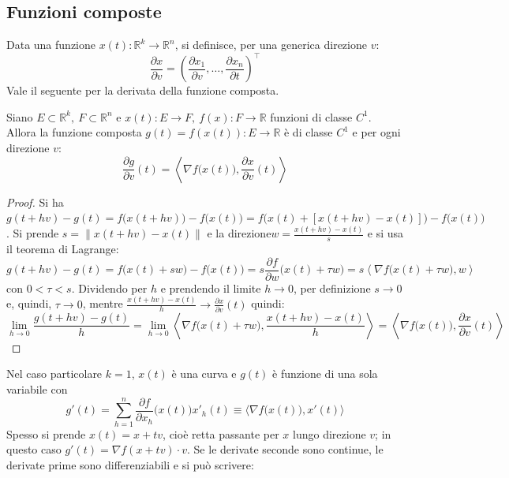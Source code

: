 \documentclass[10pt, a4paper]{scrartcl}
\theoremstyle{definition}
\numberwithin{esempio}{section}
\theoremstyle{definition}
\numberwithin{obs}{section}
\numberwithin{nota}{section}
\numberwithin{equation}{subsection}
\begin{document}
\subsection{Funzioni composte}
	Data una funzione $x(t) : \mathbb{R}^k \to \mathbb{R}^n$, si definisce, per una generica direzione $v$:
	\begin{equation}
		\frac{\partial x}{\partial v} = \left(\frac{\partial x_1}{\partial v}, \ldots , \frac{\partial x_n}{\partial t}  \right) ^\top
	\end{equation}
Vale il seguente per la derivata della funzione composta.
\begin{teorema}
	{}{}
	Siano $E \subset  \mathbb{R}^k , \ F \subset \mathbb{R}^n$ e $x(t) : E \to F , \ f(x) : F \to \mathbb{R}$ funzioni di classe $C^1$. Allora la funzione composta $g(t) = f(x(t)) : E \to\mathbb{R}$ \`e di classe $C^1$ e per ogni direzione $v$:
	\begin{equation}
		\frac{\partial g}{\partial v} (t) =\left\langle \nabla f\big(x(t)\big), \frac{\partial x}{\partial v} (t) \right\rangle
	\end{equation}
	\begin{proof}
		Si ha $g(t + h v) -g(t) = f\big(x(t+hv)\big) - f\big(x(t)\big) = f\big(x(t) + [x(t+hv) - x(t)]\big) - f\big(x(t)\big)$. Si prende $s = \lVert x(t+hv) - x(t) \rVert $ e la direzione$w = \frac{x(t+hv) - x(t)}{s}$ e si usa il teorema di Lagrange:
		\[
		g(t+hv) - g(t) = f\big(x(t) + s w\big) - f\big(x(t)\big) = s \frac{\partial f}{\partial w} \big(x(t) + \tau w\big) = s \left\langle \nabla f \big(x(t) + \tau  w\big), w \right\rangle
		\] 
	con $0<\tau <s$. Dividendo per $h$ e prendendo il limite $h\to 0$, per definizione $s \to 0$ e, quindi, $\tau  \to 0$, mentre $\frac{x(t+hv) - x(t)}{h}\to \frac{\partial x}{\partial v} (t)$ quindi:
\[
\lim_{h \to 0} \frac{g(t+ hv) -g(t)}{h} = \lim_{h \to 0} \left\langle \nabla f\big(x(t) + \tau  w\big), \frac{x(t+hv) - x(t)}{h} \right\rangle = \left\langle\nabla f\big(x(t)\big), \frac{\partial x}{\partial v} (t)  \right\rangle
\] 
	\end{proof}
\end{teorema}
\noindent Nel caso particolare $k=1$, $x(t)$ \`e una curva e $g(t)$ \`e funzione di una sola variabile con
\[
g'(t) = \sum_{h=1}^{n} \frac{\partial f}{\partial x_h} \big(x(t)\big) x'_h(t) \equiv \Big\langle \nabla f \big(x(t)\big), x'(t) \Big\rangle
\] 
Spesso si prende $x(t) = x + t v $, cio\`e retta passante per $x$ lungo direzione $v$; in questo caso $g'(t) = \nabla f(x+tv) \cdot  v$. Se le derivate seconde sono continue, le derivate prime sono differenziabili e si pu\`o scrivere:
\end{document}
